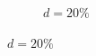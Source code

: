 \begin{figure}[!h]
\begin{subfigure}[b]{0.26\linewidth}
  	\caption{\small $d=20\%$} 
  	\label{fig:20_sweden} 
  	\vspace{4ex}
  \end{subfigure}
  \label{fig:sweden_dist} 
\end{figure}

